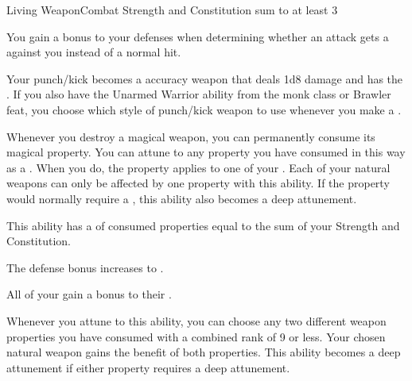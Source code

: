   \begin{feat}{Living Weapon}{Combat}
    \featpre Strength and Constitution sum to at least 3

     You gain a  bonus to your defenses when determining whether an attack gets a  against you instead of a normal hit.

     Your punch/kick  becomes a  accuracy weapon that deals 1d8 damage and has the  .
    If you also have the Unarmed Warrior ability from the monk class or Brawler feat, you choose which style of punch/kick weapon to use whenever you make a .

     Whenever you destroy a magical weapon, you can permanently consume its magical property.
    You can attune to any property you have consumed in this way as a .
    When you do, the property applies to one of your .
    Each of your natural weapons can only be affected by one property with this ability.
    If the property would normally require a , this ability also becomes a deep attunement.

    This ability has a  of consumed properties equal to the sum of your Strength and Constitution.

     The defense bonus increases to .

     All of your  gain a  bonus to their .

     Whenever you attune to this ability, you can choose any two different weapon properties you have consumed with a combined rank of 9 or less.
    Your chosen natural weapon gains the benefit of both properties.
    This ability becomes a deep attunement if either property requires a deep attunement.
  \end{feat}

